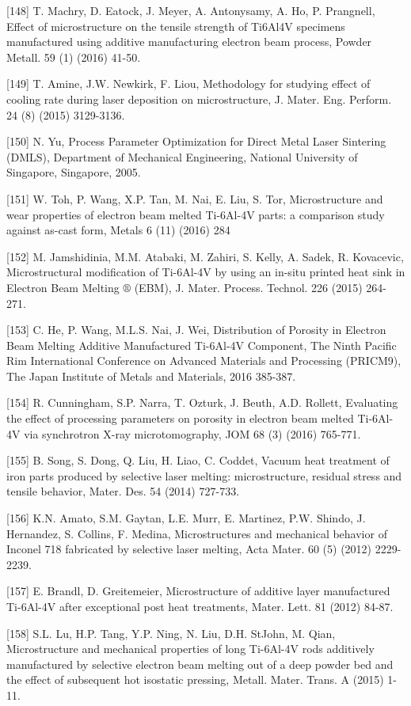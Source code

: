 \documentclass[10pt]{article}
\begin{document}
[148] T. Machry, D. Eatock, J. Meyer, A. Antonysamy, A. Ho, P. Prangnell, Effect of microstructure on the tensile strength of Ti6Al4V specimens manufactured using additive manufacturing electron beam process, Powder Metall. 59 (1) (2016) 41-50.

[149] T. Amine, J.W. Newkirk, F. Liou, Methodology for studying effect of cooling rate during laser deposition on microstructure, J. Mater. Eng. Perform. 24 (8) (2015) 3129-3136.

[150] N. Yu, Process Parameter Optimization for Direct Metal Laser Sintering (DMLS), Department of Mechanical Engineering, National University of Singapore, Singapore, 2005.

[151] W. Toh, P. Wang, X.P. Tan, M. Nai, E. Liu, S. Tor, Microstructure and wear properties of electron beam melted Ti-6Al-4V parts: a comparison study against as-cast form, Metals 6 (11) (2016) 284

[152] M. Jamshidinia, M.M. Atabaki, M. Zahiri, S. Kelly, A. Sadek, R. Kovacevic, Microstructural modification of Ti-6Al-4V by using an in-situ printed heat sink in Electron Beam Melting $®$ (EBM), J. Mater. Process. Technol. 226 (2015) 264-271.

[153] C. He, P. Wang, M.L.S. Nai, J. Wei, Distribution of Porosity in Electron Beam Melting Additive Manufactured Ti-6Al-4V Component, The Ninth Pacific Rim International Conference on Advanced Materials and Processing (PRICM9), The Japan Institute of Metals and Materials, 2016 385-387.

[154] R. Cunningham, S.P. Narra, T. Ozturk, J. Beuth, A.D. Rollett, Evaluating the effect of processing parameters on porosity in electron beam melted Ti-6Al-4V via synchrotron X-ray microtomography, JOM 68 (3) (2016) 765-771.

[155] B. Song, S. Dong, Q. Liu, H. Liao, C. Coddet, Vacuum heat treatment of iron parts produced by selective laser melting: microstructure, residual stress and tensile behavior, Mater. Des. 54 (2014) 727-733.

[156] K.N. Amato, S.M. Gaytan, L.E. Murr, E. Martinez, P.W. Shindo, J. Hernandez, S. Collins, F. Medina, Microstructures and mechanical behavior of Inconel 718 fabricated by selective laser melting, Acta Mater. 60 (5) (2012) 2229-2239.

[157] E. Brandl, D. Greitemeier, Microstructure of additive layer manufactured Ti-6Al-4V after exceptional post heat treatments, Mater. Lett. 81 (2012) 84-87.

[158] S.L. Lu, H.P. Tang, Y.P. Ning, N. Liu, D.H. StJohn, M. Qian, Microstructure and mechanical properties of long Ti-6Al-4V rods additively manufactured by selective electron beam melting out of a deep powder bed and the effect of subsequent hot isostatic pressing, Metall. Mater. Trans. A (2015) 1-11.
\end{document}

